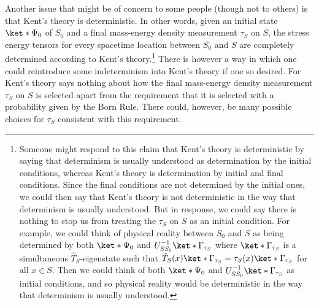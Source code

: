 \documentclass[12pt]{report}
\begin{document}
Another issue that might be of concern to some people (though not to others) is that Kent's theory is deterministic. In other words, given an initial state $\ket*{\Psi_0}$ of $S_0$ and a final mass-energy density measurement $\tau_S$ on $S$, the stress energy tensors for every spacetime location between $S_0$ and $S$ are completely determined according to Kent's theory.\footnote{Someone might respond to this claim that Kent's theory is deterministic by saying that determinism is usually understood as determination by the initial conditions, whereas Kent's theory is determination by initial and final conditions. Since the final conditions are not determined by the initial ones, we could then say that Kent's theory is not deterministic in the way that determinism is usually understood. But in response, we could say there is nothing to stop us from treating the  $\tau_S$ on $S$ as an initial condition. For example, we could think of physical reality between $S_0$ and $S$ as being determined by both $\ket*{\Psi_0}$ and $U_{SS_0}^{-1}\ket*{\Gamma_{\tau_S}}$ where $\ket*{\Gamma_{\tau_S}}$ is a simultaneous $\hat{T}_S$-eigenstate such that $\hat{T}_S(x)\ket*{\Gamma_{\tau_S}}=\tau_S(x)\ket*{\Gamma_{\tau_S}}$ for all $x\in S$. Then we could think of both $\ket*{\Psi_0}$ and $U_{SS_0}^{-1}\ket*{\Gamma_{\tau_S}}$ as initial conditions, and so physical reality would be deterministic in the way that determinism is usually understood.} There is however a way in which one could reintroduce some indeterminism into Kent's theory if one so desired. For Kent's theory says nothing about how the final mass-energy density measurement $\tau_S$ on $S$ is selected apart from the requirement that it is selected with a probability given by the Born Rule. There could, however, be many possible choices for $\tau_S$ consistent with this requirement. 
\end{document}
